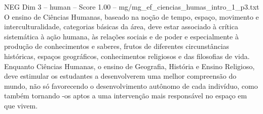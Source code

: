 \begin{textsample}{NEG Dim 3 – human – Score 1.00 – mg/mg\_ef\_ciencias\_humas\_intro\_1\_p3.txt}  \label{ex:f3_neg_014}
O ensino de Ciências Humanas, baseado na noção de tempo, espaço, movimento e interculturalidade, categorias básicas da área, deve estar associado à crítica sistemática à ação humana, às relações sociais e de poder e especialmente à produção de conhecimentos e saberes, frutos de diferentes circunstâncias históricas, espaços geográficos, conhecimentos religiosos e das filosofias de vida.
Enquanto Ciências Humanas, o ensino de Geografia, História e Ensino Religioso, deve estimular os estudantes a desenvolverem uma melhor compreensão do mundo, não só favorecendo o desenvolvimento autônomo de cada indivíduo, como também tornando -os aptos a uma intervenção mais responsável no espaço em que vivem.

\end{textsample}
